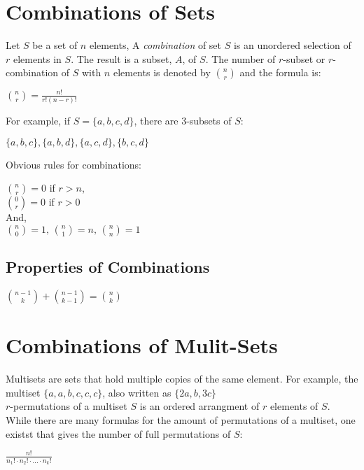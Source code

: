 \documentclass[12pt, letterpaper]{article}
\begin{document}
 
\maketitle

\section*{Combinations of Sets}

Let \(S\) be a set of \(n\) elements, A \textit{combination} of set \(S\) is an unordered selection 
of \(r\) elements in \(S\). The result is a subset, \(A\), of \(S\). The number of \(r\)-subset or \(r\)-combination
of \(S\) with \(n\) elements is denoted by \(\binom{n}{r}\) and the formula is: 

\begin{center}
  \(\binom{n}{r} = \frac{n!}{r!(n-r)!}\)
\end{center}

\noindent For example, if \(S = \{a, b, c, d\}\), there are 3-subsets of \(S\): 

\begin{center}
  \(
    \{a, b, c\}, \{a, b, d\}, \{a, c, d\}, \{b, c, d\}
  \)
\end{center}

\noindent Obvious rules for combinations:

\begin{center}
  \( \binom{n}{r} = 0 \) if \(r > n\), \\
  \( \binom{0}{r} = 0 \) if \(r > 0\) \\
  And, \\
  \( \binom{n}{0} = 1,\, \binom{n}{1}=n,\, \binom{n}{n} = 1\)
\end{center}

\subsection*{Properties of Combinations}

\begin{center}
  \( \binom{n-1}{k} + \binom{n-1}{k-1} = \binom{n}{k} \)
\end{center}

\pagebreak
\section*{Combinations of Mulit-Sets}
Multisets are sets that hold multiple copies of the same element. For example, 
the multiset \(\{a, a, b, c, c, c\}\), also written as \(\{2a, b ,3c\}\) \\

\noindent \(r\)-permutations of a multiset \(S\) is an ordered arrangment of \(r\) elements of \(S\). 
While there are many formulas for the amount of permutations of a multiset, one existst that gives 
the number of full permutations of \(S\): 

\begin{center}
  \(\frac{n!}{n_1! \cdot n_2! \cdot \dots \cdot n_k! }\)
\end{center}
\end{document}
